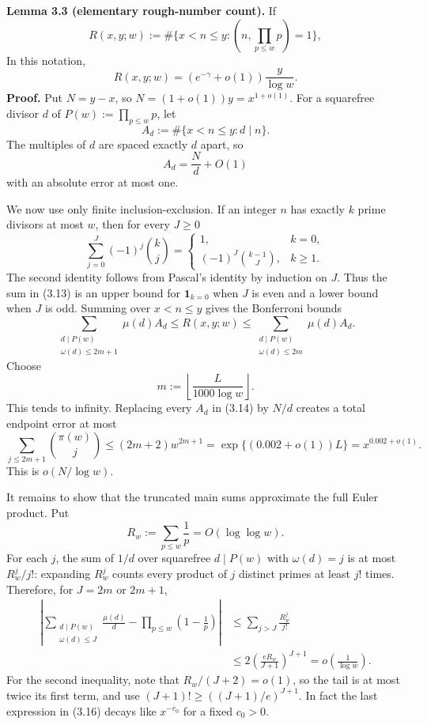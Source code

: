 \documentclass[10pt,letterpaper]{article}
\newcommand{\ind}{\mathbf{1}}
\begin{document}
\textbf{Lemma 3.3 (elementary rough-number count).} If
\[
R(x,y;w):=\#\{x<n\le y:(n,\prod_{p\le w}p)=1\},
\]
In this notation,
\begin{equation}
R(x,y;w)=(e^{-\gamma}+o(1))\frac{y}{\log w}.
\tag{3.11}
\end{equation}
\textbf{Proof.} Put $N=y-x$, so $N=(1+o(1))y=x^{1+o(1)}$. For a squarefree divisor $d$ of $P(w):=\prod_{p\le w}p$, let
\[
A_d:=\#\{x<n\le y:d\mid n\}.
\]
The multiples of $d$ are spaced exactly $d$ apart, so
\begin{equation}
A_d=\frac{N}{d}+O(1)
\tag{3.12}
\end{equation}
with an absolute error at most one.

We now use only finite inclusion-exclusion. If an integer $n$ has exactly $k$ prime divisors at most $w$, then for
every $J\ge0$
\begin{equation}
\sum_{j=0}^J(-1)^j\binom{k}{j}=\begin{cases}
1,&k=0,\\
(-1)^J\binom{k-1}{J},&k\ge1.
\end{cases}
\tag{3.13}
\end{equation}
The second identity follows from Pascal's identity by induction on $J$. Thus the sum in (3.13) is an upper
bound for $\ind_{k=0}$ when $J$ is even and a lower bound when $J$ is odd. Summing over $x<n\le y$ gives the Bonferroni
bounds
\begin{equation}
\sum_{\substack{d\mid P(w)\\\omega(d)\le2m+1}}\mu(d)A_d
\le R(x,y;w)\le
\sum_{\substack{d\mid P(w)\\\omega(d)\le2m}}\mu(d)A_d.
\tag{3.14}
\end{equation}
Choose
\[
m:=\left\lfloor\frac{L}{1000\log w}\right\rfloor.
\]
This tends to infinity. Replacing every $A_d$ in (3.14) by $N/d$ creates a total endpoint error at most
\begin{equation}
\sum_{j\le2m+1}\binom{\pi(w)}{j}
\le(2m+2)w^{2m+1}=\exp\{(0.002+o(1))L\}=x^{0.002+o(1)}.
\tag{3.15}
\end{equation}
This is $o(N/\log w)$.

It remains to show that the truncated main sums approximate the full Euler product. Put
\[
R_w:=\sum_{p\le w}\frac1p=O(\log\log w).
\]
For each $j$, the sum of $1/d$ over squarefree $d\mid P(w)$ with $\omega(d)=j$ is at most $R_w^j/j!$: expanding $R_w^j$ counts
every product of $j$ distinct primes at least $j!$ times. Therefore, for $J=2m$ or $2m+1$,
\begin{equation}
\begin{aligned}
\left|\sum_{\substack{d\mid P(w)\\\omega(d)\le J}}\frac{\mu(d)}{d}
-\prod_{p\le w}\left(1-\frac1p\right)\right|
&\le\sum_{j>J}\frac{R_w^j}{j!}\\
&\le2\left(\frac{eR_w}{J+1}\right)^{J+1}
=o\left(\frac1{\log w}\right).
\end{aligned}
\tag{3.16}
\end{equation}
For the second inequality, note that $R_w/(J+2)=o(1)$, so the tail is at most twice its first term, and use
$(J+1)!\ge((J+1)/e)^{J+1}$. In fact the last expression in (3.16) decays like $x^{-c_0}$ for a fixed $c_0>0$.
\end{document}
